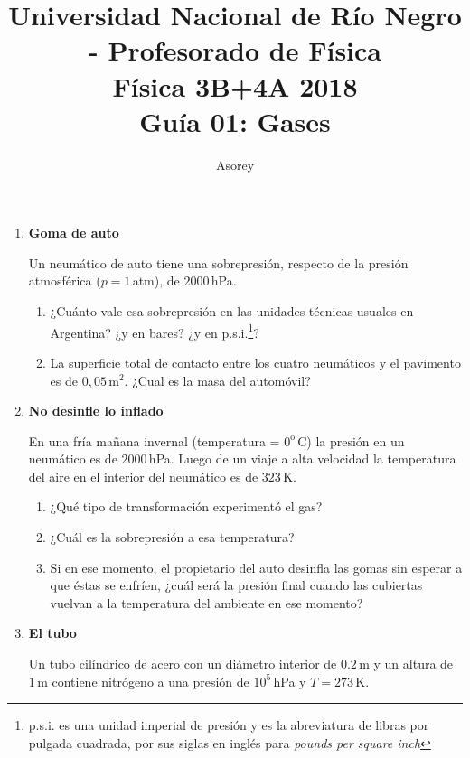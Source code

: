 \documentclass[a4paper,12pt]{article}
\begin{document}
\title{
{\normalsize{Universidad Nacional de Río Negro - Profesorado de Física}}\\
Física 3B+4A  2018 \\ Guía 01: Gases}
\author{Asorey}
\maketitle

\begin{enumerate}
	\setcounter{enumi}{0}      %

	\item {\bf{Goma de auto}}
		
		Un neumático de auto tiene una sobrepresión, respecto de la presión
		atmosférica ($p=1$\,atm), de $2000$\,hPa.
		\begin{enumerate}
			\item ¿Cuánto vale esa sobrepresión en las unidades técnicas usuales en
				Argentina? ¿y en bares? ¿y en p.s.i.\footnote{p.s.i. es una
				unidad imperial de presión y es la abreviatura de libras por
				pulgada cuadrada, por sus siglas en inglés para {\textit{pounds
				per square inch}}}? 
			\item La superficie total de contacto entre los cuatro neumáticos y
				el pavimento es de $0,05$\,m$^2$. ¿Cual es la masa del
				automóvil?
		\end{enumerate}
	
	\item {\bf{No desinfle lo inflado}}
		
		En una fría mañana invernal (temperatura = $0^\mathrm{o}$\,C) la
		presión en un neumático es de $2000$\,hPa. Luego de un viaje a alta
		velocidad la temperatura del aire en el interior del neumático es de
		$323$\,K.
		\begin{enumerate}
			\item ¿Qué tipo de transformación experimentó el gas?
			\item ¿Cuál es la sobrepresión a esa temperatura?
			\item Si en ese momento, el propietario del auto desinfla las gomas
				sin esperar a que éstas se enfríen, ¿cuál será la presión final
				cuando las cubiertas vuelvan a la temperatura del ambiente en
				ese momento?
		\end{enumerate}
	
	\item {\bf{El tubo}}
		
		Un tubo cilíndrico de acero con un diámetro interior de $0.2$\,m y un
		altura de $1$\,m contiene nitrógeno a una presión de $10^5$\,hPa y
		$T=273$\,K.


\end{enumerate}
\end{document}
